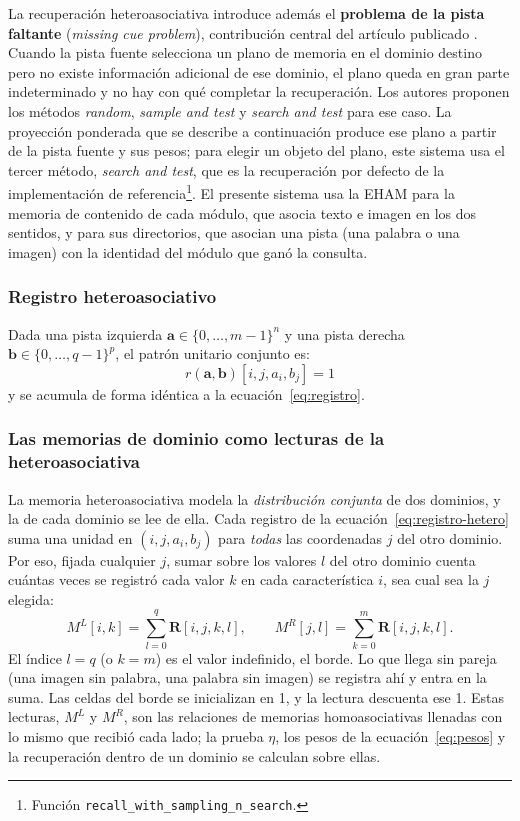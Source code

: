 La recuperación heteroasociativa introduce además el \textbf{problema de la pista faltante}
(\emph{missing cue problem}), contribución central del artículo publicado
\cite{morales2025missing}.
Cuando la pista fuente selecciona un plano de memoria en el dominio destino pero no
existe información adicional de ese dominio, el plano queda en gran parte indeterminado y no hay con qué completar la recuperación.
Los autores proponen los métodos \emph{random}, \emph{sample and test} y
\emph{search and test} para ese caso.
La proyección ponderada que se describe a continuación produce ese plano a partir de la
pista fuente y sus pesos; para elegir un objeto del plano, este sistema usa el tercer
método, \emph{search and test}, que es la recuperación por defecto de la implementación
de referencia\footnote{Función \texttt{recall\_with\_sampling\_n\_search}.}.
El presente sistema usa la EHAM para la memoria de contenido de cada módulo, que asocia
texto e imagen en los dos sentidos, y para sus directorios, que asocian una pista (una
palabra o una imagen) con la identidad del módulo que ganó la consulta.

\subsubsection*{Registro heteroasociativo}

Dada una pista izquierda $\mathbf{a} \in \{0,\ldots,m-1\}^n$ y una pista derecha
$\mathbf{b} \in \{0,\ldots,q-1\}^p$, el patrón unitario conjunto es:
\begin{equation}
    r(\mathbf{a}, \mathbf{b})[i, j, a_i, b_j] = 1
    \label{eq:registro-hetero}
\end{equation}
y se acumula de forma idéntica a la ecuación~\eqref{eq:registro}.

\subsubsection*{Las memorias de dominio como lecturas de la heteroasociativa}

La memoria heteroasociativa modela la \emph{distribución conjunta} de dos dominios, y
la de cada dominio se lee de ella.
Cada registro de la ecuación~\eqref{eq:registro-hetero} suma una unidad en
$(i, j, a_i, b_j)$ para \emph{todas} las coordenadas $j$ del otro dominio.
Por eso, fijada cualquier $j$, sumar sobre los valores $l$ del otro dominio cuenta
cuántas veces se registró cada valor $k$ en cada característica $i$, sea cual sea la $j$
elegida:
\begin{equation}
    M^{L}[i, k] = \sum_{l=0}^{q} \mathbf{R}[i, j, k, l],
    \qquad
    M^{R}[j, l] = \sum_{k=0}^{m} \mathbf{R}[i, j, k, l].
    \label{eq:marginal}
\end{equation}
El índice $l = q$ (o $k = m$) es el valor indefinido, el borde.
Lo que llega sin pareja (una imagen sin palabra, una palabra sin imagen) se registra ahí
y entra en la suma.
Las celdas del borde se inicializan en 1, y la lectura descuenta ese 1.
Estas lecturas, $M^{L}$ y $M^{R}$, son las relaciones de memorias homoasociativas
llenadas con lo mismo que recibió cada lado; la prueba $\eta$, los pesos de la
ecuación~\eqref{eq:pesos} y la recuperación dentro de un dominio se calculan sobre ellas.

